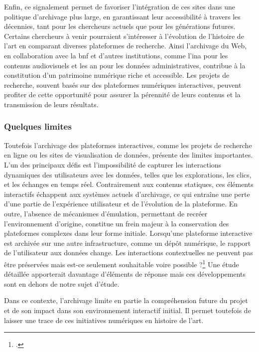 Enfin, ce signalement permet de favoriser l'intégration de ces sites dans une politique d'archivage plus large, en garantissant leur accessibilité à travers les décennies, tant pour les chercheurs actuels que pour les générations futures. Certains chercheurs à venir pourraient s'intéresser à l'évolution de l'histoire de l'art en comparant diverses plateformes de recherche. Ainsi l'archivage du Web, en collaboration avec la \acrshort{bnf} et d'autres institutions, comme l'\acrshort{ina} pour les contenus audiovisuels et les \acrshort{an} pour les données administratives, contribue à la constitution d'un patrimoine numérique riche et accessible. Les projets de recherche, souvent basés sur des plateformes numériques interactives, peuvent profiter de cette opportunité pour assurer la pérennité de leurs contenus et la transmission de leurs résultats. 

\subsubsection{Quelques limites}

Toutefois l'archivage des plateformes interactives, comme les projets de recherche en ligne ou les sites de visualisation de données, présente des limites importantes. L'un des principaux défis est l'impossibilité de capturer les interactions dynamiques des utilisateurs avec les données, telles que les explorations, les clics, et les échanges en temps réel. Contrairement aux contenus statiques, ces éléments interactifs échappent aux systèmes actuels d'archivage, ce qui entraîne une perte d'une partie de l'expérience utilisateur et de l'évolution de la plateforme. En outre, l'absence de mécanismes d'émulation, permettant de recréer l'environnement d'origine, constitue un frein majeur à la conservation des plateformes complexes dans leur forme initiale.  Lorsqu'une plateforme interactive est archivée sur une autre infrastructure, comme un dépôt numérique, le rapport de l'utilisateur aux données change. Les interactions contextuelles ne peuvent pas être préservées mais est-ce seulement souhaitable voire possible ?\footcite{BERMESEcran2024} Une étude détaillée apporterait davantage d'éléments de réponse mais ces développements sont en dehors de notre sujet d'étude. 

     Dans ce contexte, l'archivage limite en partie la compréhension future du projet et de son impact dans son environnement interactif initial. Il permet toutefois de laisser une trace de ces initiatives numériques en histoire de l'art. 

